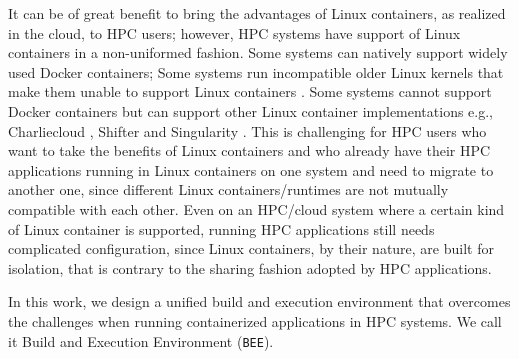 It can be of great benefit to bring the advantages of 
Linux containers, as realized in the cloud, to HPC users; however, HPC systems have support of Linux containers in a non-uniformed fashion. Some systems can natively support widely used Docker containers; Some systems run incompatible older Linux kernels that make them unable to support Linux containers \cite{harji2013our}. Some systems cannot support Docker containers but can support other Linux container implementations e.g., Charliecloud \cite{priedhorsky2016charliecloud}, Shifter \cite{jacobsen2015contain} and Singularity \cite{kurtzer_2016_60736}. This is challenging for HPC users who want to take the benefits of Linux containers and who already have their HPC applications running in Linux containers on one system and need to migrate to another one, since different Linux containers/runtimes are not mutually compatible with each other.  Even on an HPC/cloud system where a certain kind of Linux container is supported, running HPC applications still needs complicated configuration, since Linux containers, by their nature, are built for isolation, that is contrary to the sharing fashion adopted by HPC applications.





In this work, we design a unified build and execution environment that overcomes the challenges when running containerized applications in HPC systems.  We call it Build and Execution Environment (\texttt{BEE}). 



